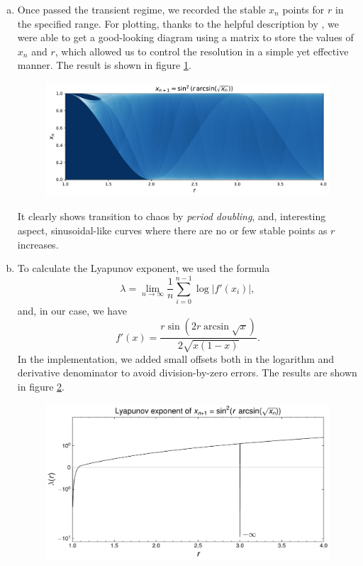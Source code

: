 \begin{enumerate}[(a)]

    \item Once passed the transient regime, we recorded the stable $x_n$ points
    for $r$ in the specified range. For plotting, thanks to the helpful description
    by \cite{WikiTentMap}, we were able to get a good-looking diagram using a
    matrix to store the values of $x_n$ and $r$, which allowed us to control
    the resolution in a simple yet effective manner. The result is shown in figure
    \ref{fig:5a}.

    \begin{figure}[!ht]
        \centering
        \includegraphics[scale=0.65]{images/5a[1-4].pdf}
        \label{fig:5a}
    \end{figure}

    It clearly shows transition to chaos by \textit{period doubling}, and, interesting
    aspect, sinusoidal-like curves where there are no or few stable points as 
    $r$ increases.
    \item To calculate the Lyapunov exponent, we used the formula
    \[
        \lambda = \lim_{n \to \infty} \frac{1}{n} \sum_{i=0}^{n-1} \log{|f'(x_i)|},
    \]
    and, in our case, we have
    \[
        f'(x) = \frac{r\sin{\left(2r\arcsin{\sqrt{x}}\right)}}{2\sqrt{x(1-x)}}.
    \]
    In the implementation, we added small offsets both in the logarithm and 
    derivative denominator to avoid division-by-zero errors. The results are shown
    in figure \ref{fig:5b}.

    \begin{figure}[!ht]
        \centering
        \includegraphics[scale=0.75]{images/5b[1-4].pdf}
        \label{fig:5b}
    \end{figure}


\end{enumerate}
